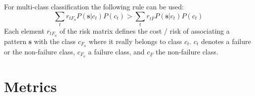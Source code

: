 \documentclass[mscthesis]{usiinfthesis}
\begin{document}
For multi-class classification the following rule can be used:
\begin{equation}
    \sum_t r_{tF_a} P(\boldsymbol{s}|c_t) P(c_t)
    > \sum_t r_{t\bar{F}} P(\boldsymbol{s}|c_t) P(c_t)
\end{equation}
Each element $r_{tF_a}$ of the risk matrix defines the cost / risk of
associating a pattern $\boldsymbol{s}$ with the class $c_{F_a}$ where it really
belongs to class $c_t$. $c_t$ denotes a failure or the non-failure class,
$c_{F_a}$ a failure class, and $c_{\bar{F}}$ the non-failure class.

\section{Metrics}
\label{ch:event_metrics}
\end{document}
